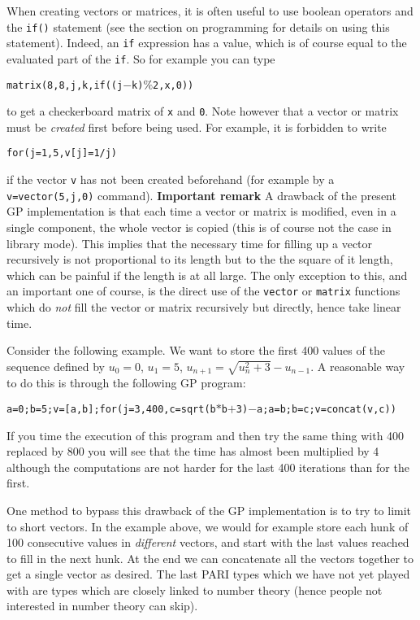 When creating vectors or matrices, it is often useful to use boolean operators
and the {\tt if()} statement (see the section on programming for details on
using this statement). Indeed, an {\tt if} expression has a value, which is of
course equal to the evaluated part of the {\tt if}. So for example you can
type

\centerline{{\tt matrix(8,8,j,k,if((j$-$k)$\%$2,x,0))} }

to get a checkerboard matrix of {\tt x} and {\tt 0}. Note however that a
vector or matrix must be {\it created} first before being used. For example,
it is forbidden to write 

\centerline{{\tt for(j=1,5,v[j]=1/j)}}

if the vector {\tt v} has not been created beforehand (for example by a
{\tt v=vector(5,j,0)} command).
\medskip
{\bf Important remark}
\medskip
A drawback of the present GP implementation is that each time a vector or
matrix is modified, even in a single component, the whole vector is copied
(this is of course not the case in library mode). This implies that the 
necessary time for filling up a vector recursively is not proportional to
its length but to the the square of it length, which can be painful if the
length is at all large. The only exception to this, and an important one of
course, is the direct use of the {\tt vector} or {\tt matrix} functions which
do {\it not} fill the vector or matrix recursively but directly, hence take
linear time.

Consider the following example. We want to store the first 400 values of the
sequence defined by $u_0=0$, $u_1=5$, $u_{n+1}=\sqrt{u_n^2+3}-u_{n-1}$.
A reasonable way to do this is through the following GP program:

{\tt a=0;b=5;v=[a,b];for(j=3,400,c=sqrt(b$*$b$+$3)$-$a;a=b;b=c;v=concat(v,c))}

If you time the execution of this program and then try the same thing with
400 replaced by 800 you will see that the time has almost been multiplied by
4 although the computations are not harder for the last 400 iterations than for
the first.

One method to bypass this drawback of the GP implementation is to try to limit
to short vectors. In the example above, we would for example store each hunk of
100 consecutive values in {\it different} vectors, and start with the last 
values reached to fill in the next hunk. At the end we can concatenate all the
vectors together to get a single vector as desired.
\medskip
The last PARI types which we have not yet played with are types which are
closely linked to number theory (hence people not interested in number theory
can skip).

